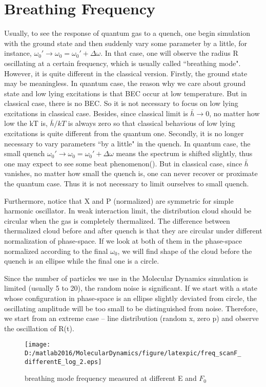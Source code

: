 \documentclass[aps,pre,twocolumn
,groupedaddress]{revtex4-1}
\begin{document}
\begin{comment}
\begin{figure}[hbtp]
\centering
\texttt{[image: D:/matlab2016/MolecularDynamics/figure/Eg1.eps]}
\caption{ground state Energy with $F_0$}
\end{figure}
\end{comment}

\newpage
\section{Breathing Frequency}
Usually, to see the response of quantum gas to a quench, one begin simulation with the ground state and then suddenly vary some parameter by a little, for instance, $\omega_0'\rightarrow\omega_0=\omega_0'+\Delta\omega$. In that case, one will observe the radius R oscillating at a certain frequency, which is usually called ``breathing mode".
However, it is quite different in the classical version. Firstly, the ground state may be meaningless. In quantum case, the reason why we care about ground state and low lying excitations is that BEC occur at low temperature. But in classical case, there is no BEC. So it is not necessary to focus on low lying excitations in classical case. Besides, since classical limit is $\bar{h}\rightarrow 0$, no matter how low the kT is, $\bar{h}/kT$ is always zero so that classical behavious of low lying excitations is quite different from the quantum one. Secondly, it is no longer necessary to vary parameters ``by a little" in the quench. In quantum case, the small quench $\omega_0'\rightarrow\omega_0=\omega_0'+\Delta\omega$ means the spectrum is shifted slightly, thus one may expect to see some beat phenomenon({\color{red}{?}}). But in classical case, since $\bar{h}$ vanishes, no matter how small the quench is, one can never recover or proximate the quantum case. Thus it is not necessary to limit ourselves to small quench. 

Furthermore, notice that X and P (normalized) are symmetric for simple harmonic oscillator. In weak interaction limit, the distribution cloud should be circular when the gas is completely thermalized. The difference between thermalized cloud before and after quench is that they are circular under different normalization of phase-space. If we look at both of them in the phase-space normalized according to the final $\omega_0$, we will find shape of the cloud before the quench is an ellipse while the final one is a circle.

Since the number of particles we use in the Molecular Dynamics simulation is limited (usually 5 to 20), the random noise is significant. If we start with a state whose configuration in phase-space is an ellipse slightly deviated from circle, the oscillating amplitude will be too small to be distinguished from noise. Therefore, we start from an extreme case -- line distribution (random x, zero p) and observe the oscillation of R(t). 
\begin{figure}[hbtp]
\center
\texttt{[image: D:/matlab2016/MolecularDynamics/figure/latexpic/freq\_scanF\_differentE\_log\_2.eps]}
\caption{breathing mode frequency measured at different E and $F_0$}
\label{fig:Breathingfrequency1}
\end{figure}
\end{document}
